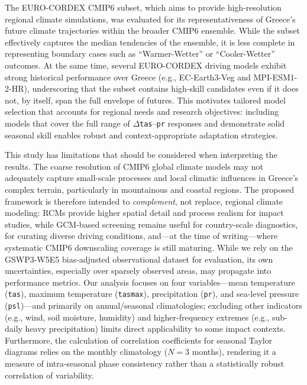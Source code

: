 \documentclass[pdflatex,sn-chicago]{sn-jnl}%
\theoremstyle{thmstyleone}%
\theoremstyle{thmstyletwo}%
\theoremstyle{thmstylethree}%
\begin{document}
The EURO-CORDEX CMIP6 subset, which aims to provide high-resolution regional climate simulations, was evaluated for its representativeness of Greece’s future climate trajectories within the broader CMIP6 ensemble. While the subset effectively captures the median tendencies of the ensemble, it is less complete in representing boundary cases such as ``Warmer-Wetter'' or ``Cooler-Wetter'' outcomes. At the same time, several EURO-CORDEX driving models exhibit strong historical performance over Greece (e.g., EC-Earth3-Veg and MPI-ESM1-2-HR), underscoring that the subset contains high-skill candidates even if it does not, by itself, span the full envelope of futures. This motivates tailored model selection that accounts for regional needs and research objectives: including models that cover the full range of \(\Delta\)\texttt{tas}--\texttt{pr} responses and demonstrate solid seasonal skill enables robust and context-appropriate adaptation strategies.


This study has limitations that should be considered when interpreting the results. The coarse resolution of CMIP6 global climate models may not adequately capture small-scale processes and local climatic influences in Greece’s complex terrain, particularly in mountainous and coastal regions. The proposed framework is therefore intended to \emph{complement}, not replace, regional climate modeling: RCMs provide higher spatial detail and process realism for impact studies, while GCM-based screening remains useful for country-scale diagnostics, for curating diverse driving conditions, and---at the time of writing---where systematic CMIP6 downscaling coverage is still maturing. While we rely on the GSWP3-W5E5 bias-adjusted observational dataset for evaluation, its own uncertainties, especially over sparsely observed areas, may propagate into performance metrics. Our analysis focuses on four variables---mean temperature (\texttt{tas}), maximum temperature (\texttt{tasmax}), precipitation (\texttt{pr}), and sea-level pressure (\texttt{psl})---and primarily on annual/seasonal climatologies; excluding other indicators (e.g., wind, soil moisture, humidity) and higher-frequency extremes (e.g., sub-daily heavy precipitation) limits direct applicability to some impact contexts. Furthermore, the calculation of correlation coefficients for seasonal Taylor diagrams relies on the monthly climatology ($N=3$ months), rendering it a measure of intra-seasonal phase consistency rather than a statistically robust correlation of variability.
\end{document}
